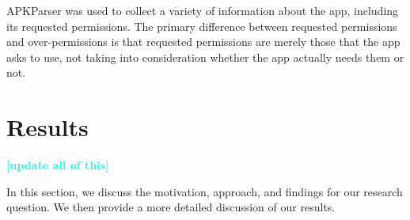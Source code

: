 \documentclass{sig-alternate-05-2015}
\newcommand{\todo}[1]{\textcolor{cyan}{\textbf{[#1]}}}
\begin{document}
APKParser was used to collect a variety of information about the app, including its requested permissions. The primary difference between requested permissions and over-permissions is that requested permissions are merely those that the app asks to use, not taking into consideration whether the app actually needs them or not.


\section{Results}
\label{sec:Results}
\todo{update all of this}

In this section, we discuss the motivation, approach, and findings for our research question. We then provide a more detailed discussion of our results.


\end{document}
